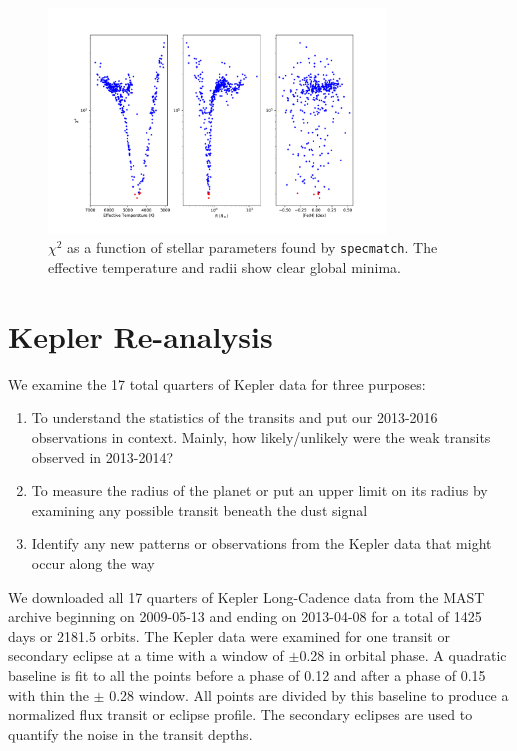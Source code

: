 \documentclass[preprint]{aastex61}
\begin{document}
\begin{figure}[!hbtp]
\begin{centering}
\includegraphics[width=0.8\textwidth]{images/subaru/spec_chi_min.pdf}
\caption{$\chi^2$ as a function of stellar parameters found by \texttt{specmatch}.
The effective temperature and radii show clear global minima.}\label{fig:specMatch}
\end{centering}
\end{figure}


\clearpage

\section{Kepler Re-analysis}
We examine the 17 total quarters of Kepler data for three purposes:
\begin{enumerate}
	\item To understand the statistics of the transits and put our 2013-2016 observations in context. Mainly, how likely/unlikely were the weak transits observed in 2013-2014?
	\item To measure the radius of the planet or put an upper limit on its radius by examining any possible transit beneath the dust signal
	\item Identify any new patterns or observations from the Kepler data that might occur along the way
\end{enumerate}

We downloaded all 17 quarters of Kepler Long-Cadence data from the MAST archive beginning on 2009-05-13 and ending on 2013-04-08 for a total of 1425 days or 2181.5 orbits.
The Kepler data were examined for one transit or secondary eclipse at a time with a window of $\pm$0.28 in orbital phase.
A quadratic baseline is fit to all the points before a phase of 0.12 and after a phase of 0.15 with thin the $\pm$ 0.28 window.
All points are divided by this baseline to produce a normalized flux transit or eclipse profile.
The secondary eclipses are used to quantify the noise in the transit depths.
\end{document}
